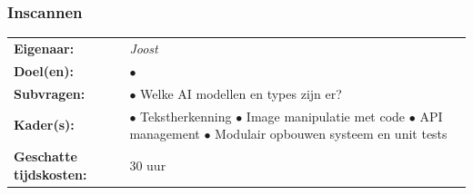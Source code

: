 \documentclass[12pt]{article}
\begin{document}
\subsubsection{Inscannen}
\begin{tabularx}{\linewidth}{@{}ll}
    \textbf{Eigenaar: } & \textit{Joost} \\
    \textbf{Doel(en): } & 
        \makecell[tl]{
            $\bullet$  \\
        } \\
    \textbf{Subvragen: } & 
        \makecell[tl]{
            $\bullet$ Welke AI modellen en types zijn er? \\
        }\\
    \textbf{Kader(s): } & 
        \makecell[tl]{
            $\bullet$ Tekstherkenning\\
            $\bullet$ Image manipulatie met code\\
            $\bullet$ API management\\
            $\bullet$ Modulair opbouwen systeem en unit tests\\
        }\\
    \parbox[t]{3cm}{\raggedright \textbf{Geschatte  tijdskosten:} } & 30 uur \\
\end{tabularx}
\end{document}
